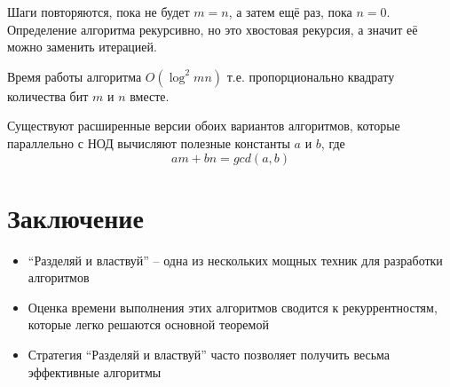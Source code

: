 \documentclass[a4paper,11pt]{article}
\begin{document}
Шаги повторяются, пока не будет $m = n$, а затем ещё раз, пока $n = 0$.
Определение алгоритма рекурсивно, но это хвостовая рекурсия, а значит её
можно заменить итерацией.

Время работы алгоритма $O(\log^2 m n)$ т.е. пропорционально квадрату
количества бит $m$ и $n$ вместе.

Существуют расширенные версии обоих вариантов алгоритмов, которые параллельно с
НОД вычисляют полезные константы $a$ и $b$, где
\begin{equation*}
  a m + b n = gcd(a, b)
\end{equation*}

\section*{Заключение}
\begin{itemize}
\item ``Разделяй и властвуй'' -- одна из нескольких мощных техник для разработки
  алгоритмов
\item Оценка времени выполнения этих алгоритмов сводится к рекуррентностям,
  которые легко решаются основной теоремой
\item Стратегия ``Разделяй и властвуй'' часто позволяет получить весьма
  эффективные алгоритмы
\end{itemize}
\end{document}
